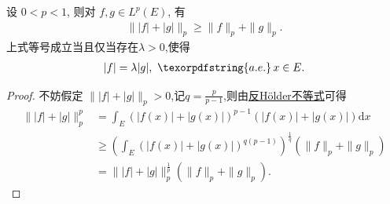 \documentclass[../../main.tex]{subfiles}%
\begin{document}
\begin{theorem}\label{theorem:反向Minkowski不等式}
设 $0<p<1$, 则对 $f,g\in L^p(E)$, 有
\begin{align*}
\||f|+|g|\|_p \geqslant \|f\|_p + \|g\|_p.
\end{align*}
上式等号成立当且仅当存在$\lambda>0$,使得
\begin{align*}
|f|=\lambda|g|,\,\,\texorpdfstring{a.e.}\,x\in E.
\end{align*}
\end{theorem}
\begin{proof}
不妨假定 $\||f|+|g|\|_p>0$,记$q=\frac{p}{p-1}$,则由\hyperref[theorem:反向Hölder不等式]{反Hölder不等式}可得
\begin{align*}
\||f|+|g|\|_p^p &= \int_E (|f(x)|+|g(x)|)^{p-1} (|f(x)|+|g(x)|) \mathrm{d}x \\
&\geqslant \left( \int_E (|f(x)|+|g(x)|)^{q(p-1)} \right)^{\frac{1}{q}} (\|f\|_p + \|g\|_p) \\
&= \||f|+|g|\|_p^{\frac{1}{p}} (\|f\|_p + \|g\|_p).
\end{align*}
\end{proof}
\end{document}
